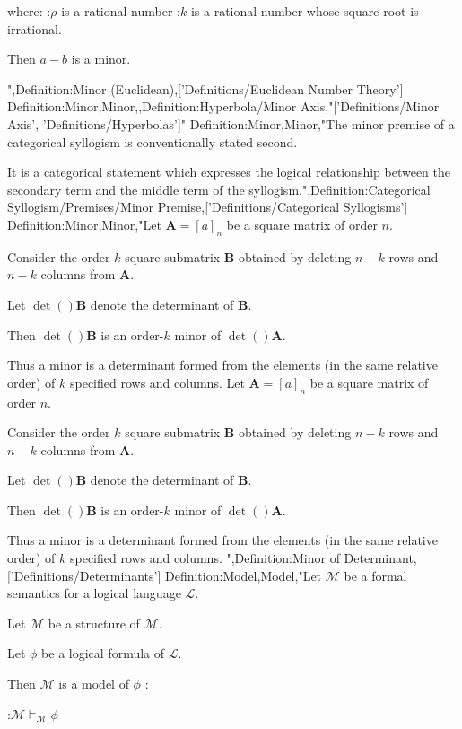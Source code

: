 where:
:$\rho$ is a rational number
:$k$ is a rational number whose square root is irrational.


Then $a - b$ is a minor.


",Definition:Minor (Euclidean),['Definitions/Euclidean Number Theory']
Definition:Minor,Minor,,Definition:Hyperbola/Minor Axis,"['Definitions/Minor Axis', 'Definitions/Hyperbolas']"
Definition:Minor,Minor,"The minor premise of a categorical syllogism is conventionally stated second.

It is a categorical statement which expresses the logical relationship between the secondary term and the middle term of the syllogism.",Definition:Categorical Syllogism/Premises/Minor Premise,['Definitions/Categorical Syllogisms']
Definition:Minor,Minor,"Let $\mathbf A = \left[ a \right]_n$ be a square matrix of order $n$.

Consider the order $k$ square submatrix $\mathbf B$ obtained by deleting $n - k$ rows and $n - k$ columns from $\mathbf A$.


Let $\det \left(   \right){\mathbf B}$ denote the determinant of $\mathbf B$.

Then $\det \left(   \right){\mathbf B}$ is an order-$k$ minor of $\det \left(   \right){\mathbf A}$.


Thus a minor is a determinant formed from the elements (in the same relative order) of $k$ specified rows and columns.
Let $\mathbf A = \left[ a \right]_n$ be a square matrix of order $n$.

Consider the order $k$ square submatrix $\mathbf B$ obtained by deleting $n - k$ rows and $n - k$ columns from $\mathbf A$.


Let $\det \left(   \right){\mathbf B}$ denote the determinant of $\mathbf B$.

Then $\det \left(   \right){\mathbf B}$ is an order-$k$ minor of $\det \left(   \right){\mathbf A}$.


Thus a minor is a determinant formed from the elements (in the same relative order) of $k$ specified rows and columns.
",Definition:Minor of Determinant,['Definitions/Determinants']
Definition:Model,Model,"Let $\mathscr M$ be a formal semantics for a logical language $\mathcal L$.

Let $\mathcal M$ be a structure of $\mathscr M$.


Let $\phi$ be a logical formula of $\mathcal L$.

Then $\mathcal M$ is a model of $\phi$ :

:$\mathcal M \models_{\mathscr M} \phi$


